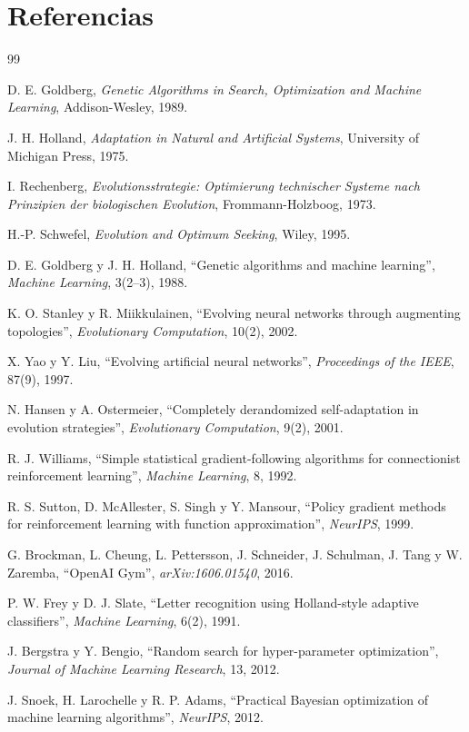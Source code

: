 \section*{Referencias}

\begin{thebibliography}{99}

D. E. Goldberg, \emph{Genetic Algorithms in Search, Optimization and Machine Learning}, Addison-Wesley, 1989.

J. H. Holland, \emph{Adaptation in Natural and Artificial Systems}, University of Michigan Press, 1975.

I. Rechenberg, \emph{Evolutionsstrategie: Optimierung technischer Systeme nach Prinzipien der biologischen Evolution}, Frommann-Holzboog, 1973.

H.-P. Schwefel, \emph{Evolution and Optimum Seeking}, Wiley, 1995.

D. E. Goldberg y J. H. Holland, ``Genetic algorithms and machine learning'', \emph{Machine Learning}, 3(2--3), 1988.

K. O. Stanley y R. Miikkulainen, ``Evolving neural networks through augmenting topologies'', \emph{Evolutionary Computation}, 10(2), 2002.

X. Yao y Y. Liu, ``Evolving artificial neural networks'', \emph{Proceedings of the IEEE}, 87(9), 1997.

N. Hansen y A. Ostermeier, ``Completely derandomized self-adaptation in evolution strategies'', \emph{Evolutionary Computation}, 9(2), 2001.

R. J. Williams, ``Simple statistical gradient-following algorithms for connectionist reinforcement learning'', \emph{Machine Learning}, 8, 1992.

R. S. Sutton, D. McAllester, S. Singh y Y. Mansour, ``Policy gradient methods for reinforcement learning with function approximation'', \emph{NeurIPS}, 1999.

G. Brockman, L. Cheung, L. Pettersson, J. Schneider, J. Schulman, J. Tang y W. Zaremba, ``OpenAI Gym'', \emph{arXiv:1606.01540}, 2016.

P. W. Frey y D. J. Slate, ``Letter recognition using Holland-style adaptive classifiers'', \emph{Machine Learning}, 6(2), 1991.

J. Bergstra y Y. Bengio, ``Random search for hyper-parameter optimization'', \emph{Journal of Machine Learning Research}, 13, 2012.

J. Snoek, H. Larochelle y R. P. Adams, ``Practical Bayesian optimization of machine learning algorithms'', \emph{NeurIPS}, 2012.

\end{thebibliography}
